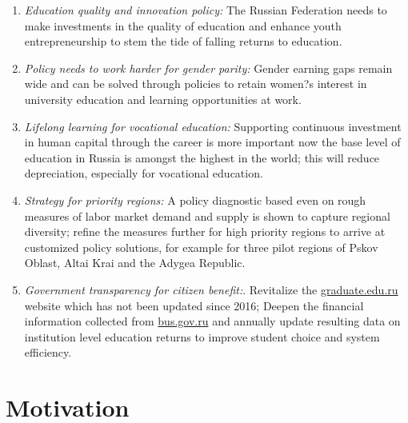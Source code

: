 \documentclass[alpha-refs]{wiley-article-04t}
\begin{document}
\begin{mdframed}[hidealllines=true,backgroundcolor=blue!20]
\begin{enumerate}
\item \textit{Education quality and innovation policy:} The Russian 
Federation needs to make investments in the quality of education and 
enhance youth entrepreneurship to stem the tide of falling returns to 
education.

\item \textit{Policy needs to work harder for gender parity:} Gender 
earning gaps remain wide and can be solved through policies to retain 
women?s interest in university education and learning opportunities at work.

\item \textit{Lifelong learning for vocational education:} Supporting 
continuous investment in human capital through the career is more important 
now the base level of education in Russia is amongst the highest in the 
world; this will reduce depreciation, especially for vocational education.

\item \textit{Strategy for priority regions:} A policy diagnostic based 
even on rough measures of labor market demand and supply is shown to 
capture regional diversity; refine the measures further for high priority 
regions to arrive at customized policy solutions, for example for three 
pilot regions of Pskov Oblast, Altai Krai and the Adygea Republic.


\item \textit{Government transparency for citizen benefit:}. Revitalize the 
\href{https:\\graduate.edu.ru}{graduate.edu.ru} website which has not 
been updated since 2016; Deepen the financial information collected from 
\href{https:\\bus.gov.ru}{bus.gov.ru} and annually update resulting data on 
institution level education returns to  improve student choice and system 
efficiency.

\end{enumerate} 

	
\end{mdframed}

\newpage

\section{Motivation}
\end{document}
